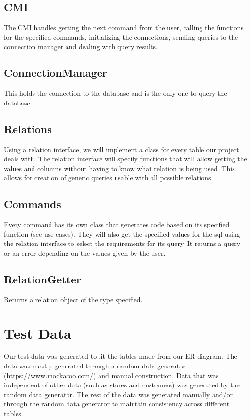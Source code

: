 \documentclass{article}
\begin{document}
		\subsection{CMI}
			The CMI handles getting the next command from the user, calling the functions for the specified commands,
			initializing the connections, sending queries to the connection manager and dealing with query results. 
			
		\subsection{ConnectionManager}
			This holds the connection to the database and is the only one to query the database. 
			
		\subsection{Relations}
			Using a relation interface, we will implement a class for every table our project deals with. The relation
			interface will specify functions that will allow getting the values and columns without having to know what
			relation is being used. This allows for creation of generic queries usable with all possible relations.
			
		\subsection{Commands}
      Every command has its own class that generates code based on its specified function (see
      use cases). They will also get the specified values for the sql using the relation
      interface to select the requirements for its query. It returns a query or an error
      depending on the values given by the user.
			
		\subsection{RelationGetter}
			Returns a relation object of the type specified. 


	\section{Test Data}
		Our test data was generated to fit the tables made from our ER diagram. The
		data was mostly generated through a random data generator
		(\url{https://www.mockaroo.com/}) and manual construction. Data that was
		independent of other data (such as stores and customers) was generated by
		the random data generator. The rest of the data was generated manually
		and/or through the random data generator to maintain consistency across
		different tables.
\end{document}
